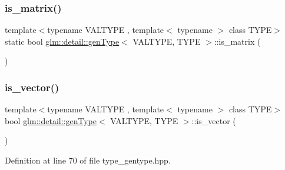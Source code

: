 \subsubsection{\texorpdfstring{is\_matrix()}{is\_matrix()}}
{\footnotesize\ttfamily template$<$typename V\+A\+L\+T\+Y\+PE , template$<$ typename $>$ class T\+Y\+PE$>$ \\
static bool \mbox{\hyperlink{structglm_1_1detail_1_1gen_type}{glm\+::detail\+::gen\+Type}}$<$ V\+A\+L\+T\+Y\+PE, T\+Y\+PE $>$\+::is\+\_\+matrix (\begin{DoxyParamCaption}{ }\end{DoxyParamCaption})\hspace{0.3cm}{\ttfamily [static]}}

\mbox{\label{structglm_1_1detail_1_1gen_type_ae83087df55201bdc46a37decf3d1c34c}} 
\subsubsection{\texorpdfstring{is\_vector()}{is\_vector()}}
{\footnotesize\ttfamily template$<$typename V\+A\+L\+T\+Y\+PE , template$<$ typename $>$ class T\+Y\+PE$>$ \\
bool \mbox{\hyperlink{structglm_1_1detail_1_1gen_type}{glm\+::detail\+::gen\+Type}}$<$ V\+A\+L\+T\+Y\+PE, T\+Y\+PE $>$\+::is\+\_\+vector (\begin{DoxyParamCaption}{ }\end{DoxyParamCaption})\hspace{0.3cm}{\ttfamily [static]}}



Definition at line 70 of file type\+\_\+gentype.\+hpp.

\mbox{\label{structglm_1_1detail_1_1gen_type_a5dcc128cfa6f3fdc478d7169ec3cb71b}} 

